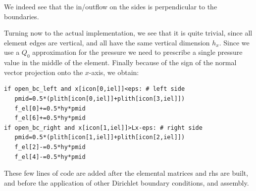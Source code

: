 We indeed see that the in/outflow on the sides is perpendicular to the boundaries. 

Turning now to the actual implementation, we see that it is quite trivial, since 
all element edges are vertical, and all have the same vertical dimension $h_x$. 
Since we use a $Q_0$ approximation for the pressure we need to prescribe a single
pressure value in the middle of the element. Finally because of the sign of the 
normal vector projection onto the $x$-axis, we obtain:

\begin{lstlisting}
if open_bc_left and x[icon[0,iel]]<eps: # left side
   pmid=0.5*(plith[icon[0,iel]]+plith[icon[3,iel]])
   f_el[0]+=0.5*hy*pmid
   f_el[6]+=0.5*hy*pmid
if open_bc_right and x[icon[1,iel]]>Lx-eps: # right side
   pmid=0.5*(plith[icon[1,iel]]+plith[icon[2,iel]])
   f_el[2]-=0.5*hy*pmid
   f_el[4]-=0.5*hy*pmid
\end{lstlisting}

These few lines of code are added after the elemental matrices and rhs are built, 
and before the application of other Dirichlet boundary conditions, and assembly.





